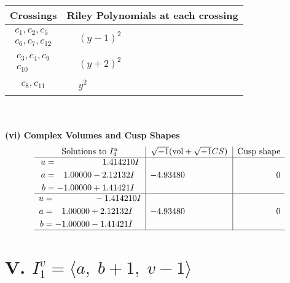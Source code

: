 \documentclass[1p]{elsarticle_modified}
\theoremstyle{definition}
\newcommand{\I}{\sqrt{-1}}
\begin{document}
\begin{tabular}{m{50pt}|m{274pt}}
Crossings & \hspace{64pt}Riley Polynomials at each crossing \\
\hline $$\begin{aligned}c_{1},c_{2},c_{5}\\c_{6},c_{7},c_{12}\end{aligned}$$&$\begin{aligned}
&(y-1)^2
\end{aligned}$\\
\hline $$\begin{aligned}c_{3},c_{4},c_{9}\\c_{10}\end{aligned}$$&$\begin{aligned}
&(y+2)^2
\end{aligned}$\\
\hline $$\begin{aligned}c_{8},c_{11}\end{aligned}$$&$\begin{aligned}
&y^2
\end{aligned}$\\
\hline
\end{tabular}\\~\\
\newpage\flushleft \textbf{(vi) Complex Volumes and Cusp Shapes}
$$\begin{array}{c|c|c}  
\text{Solutions to }I^u_{4}& \I (\text{vol} + \sqrt{-1}CS) & \text{Cusp shape}\\
 \hline 
\begin{aligned}
u &= \phantom{-0.000000 -}1.414210 I \\
a &= \phantom{-}1.00000 - 2.12132 I \\
b &= -1.00000 + 1.41421 I\end{aligned}
 & -4.93480\phantom{ +0.000000I} & \phantom{-0.000000 } 0 \\ \hline\begin{aligned}
u &= \phantom{-0.000000 } -1.414210 I \\
a &= \phantom{-}1.00000 + 2.12132 I \\
b &= -1.00000 - 1.41421 I\end{aligned}
 & -4.93480\phantom{ +0.000000I} & \phantom{-0.000000 } 0\\
 \hline 
 \end{array}$$\newpage\newpage\renewcommand{\arraystretch}{1}
\centering \section*{V. $I^v_{1}= \langle a,\;b+1,\;v-1 \rangle$}
\end{document}
